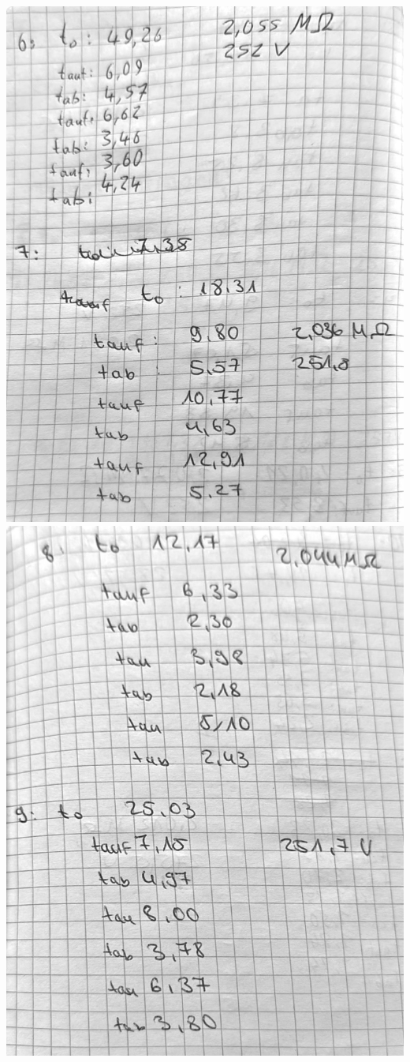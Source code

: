 \vfill\null
\newpage
\null\vfill
\includegraphics[width=.75\linewidth]{content/messung/3.jpg}
\vfill\null
\newpage
\null\vfill
\includegraphics[width=.75\linewidth]{content/messung/4.jpg}
\vfill\null
\newpage
